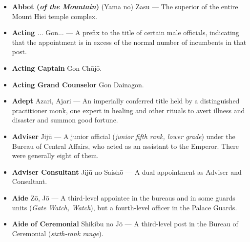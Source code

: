 \documentclass{article}
\begin{document}
\setlength{\columnsep}{4.5em}
\begin{multicols}{2}

	\begin{small}%
		\begin{itemize}[
				label=,
				leftmargin=0em,
				rightmargin=-1.5em,
				itemindent=-2em,
			]
			\setlength{\itemsep}{0.075em}

			\item \textbf{Abbot (\textit{of the Mountain})} (Yama no) Zasu --- The superior of the entire Mount Hiei temple complex.

			\item \textbf{Acting \(\ldots\)} Gon\(\ldots\)  --- A prefix to the title of certain male officials, indicating that the appointment is in excess of the normal number of incumbents in that post.

			\item \textbf{Acting Captain} Gon Chūjō.

			\item \textbf{Acting Grand Counselor} Gon Dainagon.

			\item \textbf{Adept} Azari, Ajari --- An imperially conferred title held by a distinguished practitioner monk, one expert in healing and other rituals to avert illness and disaster and summon good fortune.

			\item \textbf{Adviser} Jijū --- A junior official (\textit{junior fifth rank, lower grade}) under the Bureau of Central Affairs, who acted as an assistant to the Emperor. There were generally eight of them.

			\item \textbf{Adviser Consultant} Jijū no Saishō --- A dual appointment as Adviser and Consultant.

			\item \textbf{Aide} Zō, Jō --- A third-level appointee in the bureaus and in some guards units (\textit{Gate Watch, Watch}), but a fourth-level officer in the Palace Guards.

			\item \textbf{Aide of Ceremonial} Shikibu no Jō --- A third-level post in the Bureau of Ceremonial (\textit{sixth-rank range}).


\end{itemize}
\end{small}
\end{multicols}
\end{document}
